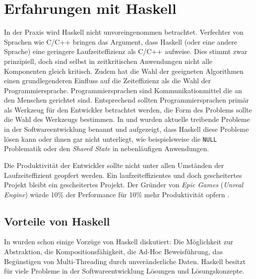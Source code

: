 \section{Erfahrungen mit Haskell}\label{sec:xp-haskell}

In der Praxis wird Haskell nicht unvoreingenommen betrachtet. Verfechter von Sprachen wie C/C++ bringen das Argument, dass Haskell (oder eine andere Sprache) eine geringere Laufzeiteffizienz als C/C++ aufweise. Dies stimmt zwar prinzipiell, doch sind selbst in zeitkritischen Anwendungen nicht alle Komponenten gleich kritisch. Zudem hat die Wahl der geeigneten Algorithmen einen grundlegenderen Einfluss auf die Zeiteffizienz als die Wahl der Programmiersprache. Programmiersprachen sind Kommunikationmittel die an den Menschen gerichtet sind. Entsprechend sollten Programmiersprachen primär als Werkzeug für den Entwickler betrachtet werden, die Form des Problems sollte die Wahl des Werkzeugs bestimmen. In  und  wurden aktuelle treibende Probleme in der Softwareentwicklung benannt und aufgezeigt, dass Haskell diese Probleme lösen kann oder ihnen gar nicht unterliegt, wie beispielsweise die \texttt{NULL} Problematik oder den \textit{Shared State} in nebenläufigen Anwendungen.


Die Produktivität der Entwickler sollte nicht unter allen Umständen der Laufzeiteffizient geopfert werden. Ein laufzeiteffizientes und doch gescheitertes Projekt bleibt ein gescheitertes Projekt. Der Gründer von \textit{Epic Games} (\textit{Unreal Engine}) würde 10\% der Performance für 10\% mehr Produktivität opfern \parencite[Seite 20]{Sweeney2006}.



\subsection{Vorteile von Haskell}

In  wurden schon einige Vorzüge von Haskell diskutiert: Die Möglichkeit zur Abstraktion, die Kompositionsfähigkeit, die Ad-Hoc Beweisführung, das Begünstigen von Multi-Threading durch unveränderliche Daten. Haskell besitzt für viele Probleme in der Softwareentwicklung Lösungen und Lösungskonzepte. 

